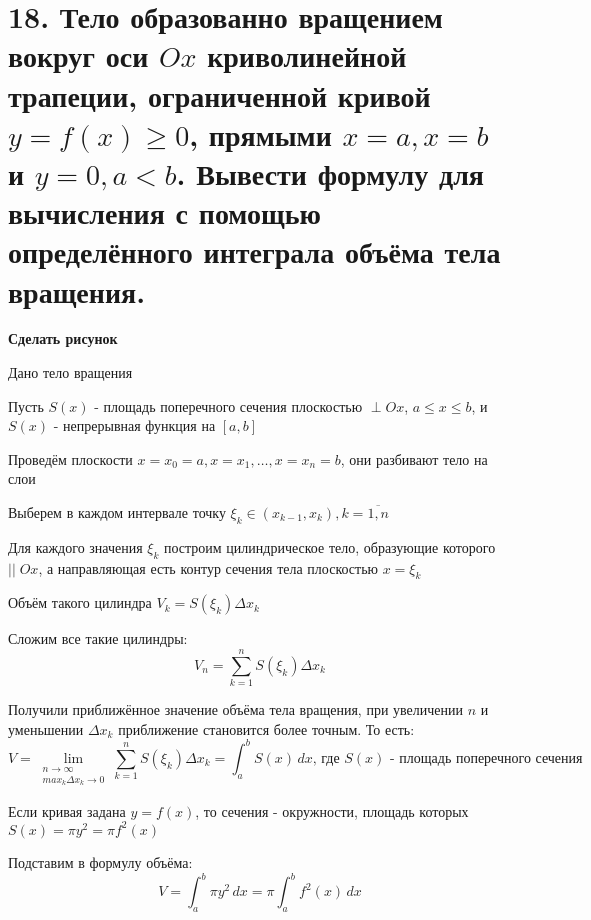 \documentclass[11pt]{article}
\begin{document}
\section*{18. Тело образованно вращением вокруг оси $Ox$ криволинейной трапеции, ограниченной кривой $y = f(x) \geq 0$, прямыми $x = a, x = b$ и $y = 0, a < b$. Вывести формулу для вычисления с помощью определённого интеграла объёма тела вращения.}
\par\textbf{Сделать рисунок}
\par Дано тело вращения
\par Пусть $S(x)$ - площадь поперечного сечения плоскостью $\perp Ox$, $a \leq x \leq b$, и $S(x)$ - непрерывная функция на $[a, b]$
\par Проведём плоскости $x = x_{0} = a, x = x_{1}, \dots, x = x_{n} = b$, они разбивают тело на слои
\par Выберем в каждом интервале точку $\xi_{k} \in (x_{k - 1}, x_{k}), k = \overline{1, n}$
\par Для каждого значения $\xi_{k}$ построим цилиндрическое тело, образующие которого $|| \; Ox$, а направляющая есть контур сечения тела плоскостью $x = \xi_{k}$
\par Объём такого цилиндра $V_{k} = S(\xi_{k}) \Delta x_{k}$
\par Сложим все такие цилиндры:$$V_{n} = \sum_{k = 1}^{n} S(\xi_{k}) \Delta x_{k}$$
\par Получили приближённое значение объёма тела вращения, при увеличении $n$ и уменьшении $\Delta x_{k}$ приближение становится более точным. То есть: $$V = \lim_{ \substack{n \to \infty \\ max_{k} \Delta x_{k} \to 0} } \sum_{k = 1}^{n} S(\xi_{k}) \Delta x_{k} = \int_{a}^{b} S(x) \, dx \text{, где } S(x) \text{ - площадь поперечного сечения}$$
\par Если кривая задана $y = f(x)$, то сечения - окружности, площадь которых $S(x) = \pi y^2 = \pi f^2(x)$
\par Подставим в формулу объёма: $$V = \int_{a}^{b} \pi y^2\, dx = \pi \int_{a}^{b} f^2(x) \, dx$$
\end{document}
